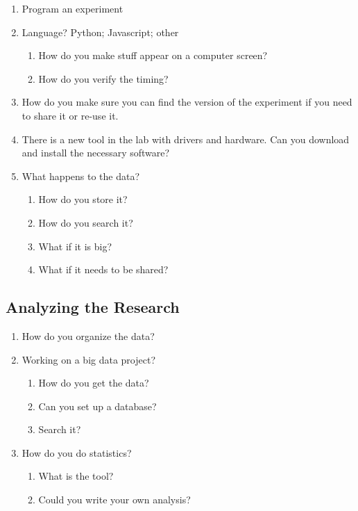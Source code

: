 \documentclass[
  letterpaper,
  DIV=11,
  numbers=noendperiod]{scrreprt}
\providecommand{\tightlist}{%
  \setlength{\itemsep}{0pt}\setlength{\parskip}{0pt}}\usepackage{longtable,booktabs,array}
\begin{document}
\begin{enumerate}
\def\labelenumi{\arabic{enumi}.}
\tightlist
\item
  Program an experiment
\item
  Language? Python; Javascript; other

  \begin{enumerate}
  \def\labelenumii{\arabic{enumii}.}
  \tightlist
  \item
    How do you make stuff appear on a computer screen?
  \item
    How do you verify the timing?
  \end{enumerate}
\item
  How do you make sure you can find the version of the experiment if you
  need to share it or re-use it.
\item
  There is a new tool in the lab with drivers and hardware. Can you
  download and install the necessary software?
\item
  What happens to the data?

  \begin{enumerate}
  \def\labelenumii{\arabic{enumii}.}
  \tightlist
  \item
    How do you store it?
  \item
    How do you search it?
  \item
    What if it is big?
  \item
    What if it needs to be shared?
  \end{enumerate}
\end{enumerate}

\subsection{Analyzing the Research}\label{analyzing-the-research}

\begin{enumerate}
\def\labelenumi{\arabic{enumi}.}
\tightlist
\item
  How do you organize the data?
\item
  Working on a big data project?

  \begin{enumerate}
  \def\labelenumii{\arabic{enumii}.}
  \tightlist
  \item
    How do you get the data?
  \item
    Can you set up a database?
  \item
    Search it?
  \end{enumerate}
\item
  How do you do statistics?

  \begin{enumerate}
  \def\labelenumii{\arabic{enumii}.}
  \tightlist
  \item
    What is the tool?
  \item
    Could you write your own analysis?
  \end{enumerate}
\end{enumerate}
\end{document}
